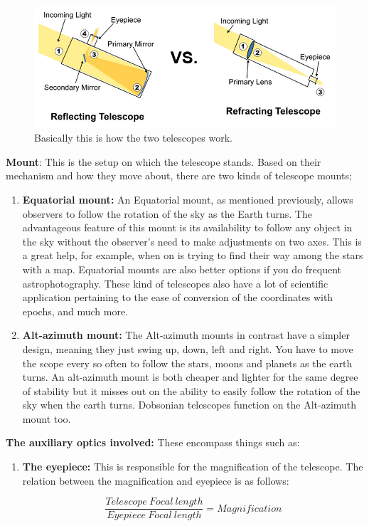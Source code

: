 \documentclass[a4paper,twoside]{article}
\numberwithin{equation}{section}
\begin{document}
\begin{enumerate}
{\begin{enumerate}
\paragraph{}
\begin{figure}[h]
\includegraphics[width=1.0\linewidth]{fig7.jpg}
\caption{Basically this is how the two telescopes work.}
\label{fig7}
\end{figure}
\end{enumerate}
\item \textbf{Mount}: This is the setup on which the telescope stands. Based on their mechanism and how they move about, there are two kinds of telescope mounts;
\begin{enumerate}  
\item \textbf{Equatorial mount:} An Equatorial mount, as mentioned previously, allows observers to follow the rotation of the sky as the Earth turns. The advantageous feature of this mount is its availability to follow any object in the sky without the observer's need to make adjustments on two axes. This is a great help, for example, when on is trying to find their way among the stars with a map. Equatorial mounts are also better options if you do frequent astrophotography. These kind of telescopes also have a lot of scientific application pertaining to the ease of conversion of the coordinates with epochs, and much more. 
\item \textbf{Alt-azimuth mount:} The Alt-azimuth mounts in contrast have a simpler design, meaning they just swing up, down, left and right. You have to move the scope every so often to follow the stars, moons and planets as the earth turns. An alt-azimuth mount is both cheaper and lighter for the same degree of stability but it misses out on the ability to easily follow the rotation of the sky when the earth turns. Dobsonian telescopes function on the Alt-azimuth mount too.
\end{enumerate}
}
\item {\textbf{The auxiliary optics involved:} These encompass things such as: 
\begin{enumerate}
\item \textbf{The eyepiece:} This is responsible for the magnification of the telescope. The relation between the magnification and eyepiece is as follows:
\begin{center}
\begin{equation}
\frac{Telescope \ Focal \ length}{Eyepiece \ Focal \ length} = Magnification
\end{equation}
\end{center}


\end{enumerate}}
\end{enumerate}
\end{document}
